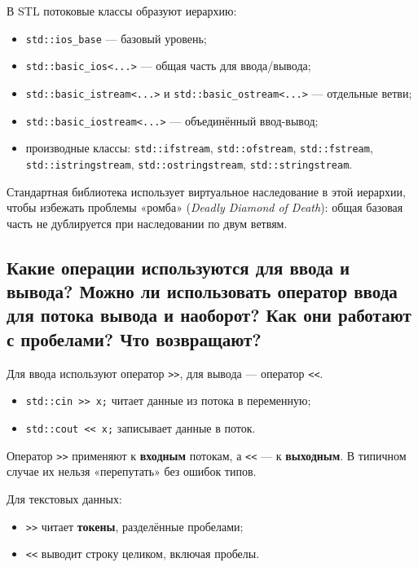 \begin{definition}
В STL потоковые классы образуют иерархию:
\begin{itemize}
    \item \texttt{std::ios\_base} — базовый уровень;
    \item \texttt{std::basic\_ios<...>} — общая часть для ввода/вывода;
    \item \texttt{std::basic\_istream<...>} и \texttt{std::basic\_ostream<...>} — отдельные ветви;
    \item \texttt{std::basic\_iostream<...>} — объединённый ввод-вывод;
    \item производные классы: \texttt{std::ifstream}, \texttt{std::ofstream}, \texttt{std::fstream}, \texttt{std::istringstream}, \texttt{std::ostringstream}, \texttt{std::stringstream}.
\end{itemize}
\end{definition}

\begin{remark}
Стандартная библиотека использует виртуальное наследование в этой иерархии, чтобы избежать проблемы «ромба» (\textit{Deadly Diamond of Death}): общая базовая часть не дублируется при наследовании по двум ветвям.
\end{remark}

\subsection{Какие операции используются для ввода и вывода? Можно ли использовать оператор ввода для потока вывода и наоборот? Как они работают с пробелами? Что возвращают?}
Для ввода используют оператор \texttt{>>}, для вывода — оператор \texttt{<<}.

\begin{itemize}
    \item \texttt{std::cin >> x;} читает данные из потока в переменную;
    \item \texttt{std::cout << x;} записывает данные в поток.
\end{itemize}

\begin{remark}
Оператор \texttt{>>} применяют к \textbf{входным} потокам, а \texttt{<<} — к \textbf{выходным}. В типичном случае их нельзя «перепутать» без ошибок типов.
\end{remark}

Для текстовых данных:
\begin{itemize}
    \item \texttt{>>} читает \textbf{токены}, разделённые пробелами;
    \item \texttt{<<} выводит строку целиком, включая пробелы.
\end{itemize}

